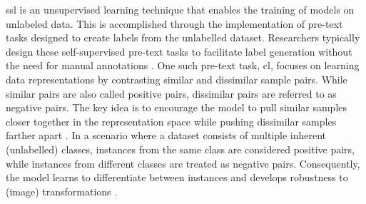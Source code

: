 \acf{ssl} is an unsupervised learning technique that enables the training of models on unlabeled data.
This is accomplished through the implementation of pre-text tasks 
designed to create labels from the unlabelled dataset.
Researchers typically design these self-supervised pre-text tasks 
to facilitate label generation without the need for manual annotations \citet{PIC_2020}.
One such pre-text task, \acf{cl}, 
focuses on learning data representations by contrasting similar and dissimilar sample pairs. 
While similar pairs are also called positive pairs, 
dissimilar pairs are referred to as negative pairs.
The key idea is to encourage the model to pull similar samples closer together in the representation space 
while pushing dissimilar samples farther apart \citet{mining_potential_2024}.
In a scenario where a dataset consists of multiple inherent (unlabelled) classes, 
instances from the same class are considered positive pairs, 
while instances from different classes are treated as negative pairs.
Consequently, the model learns to differentiate between instances and 
develops robustness to (image) transformations
\citet{PIC_2020,swav_2020,local_aggr_2019,grape_2024,CL_temp_2021}.